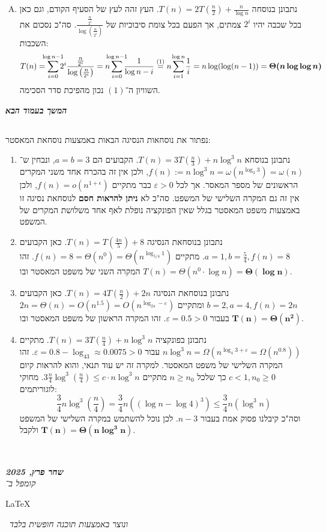 \documentclass[]{article}
\newcommand\en[1] {\begin{otherlanguage}{english}#1\end{otherlanguage}}
\newcommand\sen   {\begin{otherlanguage}{english}}
\newcommand\she   {\end{otherlanguage}}
\newcommand\npage {\she\vfil {\hfil \textbf{\textit{המשך בעמוד הבא}}} \hfil \vfil \pagebreak\sen}
\newcommand\ndoc  {\dotfill \\ \vfil {\begin{center}
			{\textbf{\textit{שחר פרץ, 2025}} \\
				\scriptsize \textit{קומפל ב־}\en{\LaTeX}\,\textit{ ונוצר באמצעות תוכנה חופשית בלבד}}
	\end{center}} \vfil	}
\newcommand\epsi  {\epsilon}
\newcommand\vepsi {\varepsilon}
\newcommand\logn  {\log n}
\newcommand\cl [1]    {\left ( #1 \right )}
\theoremstyle{definition}
\begin{document}
\begin{enumerate}[A.]
		\item נתבונן בנוסחה $T(n) = 2T\cl{\frac{n}{2}} + \frac{n}{\log n}$. העץ זהה לעץ של הסעיף הקודם, וגם כאן בכל שכבה יהיו $2^i$ צמתים, אך הפעם בכל צומת סיבוכיות של $\frac{\frac{n}{2^i}}{\log\cl{\frac{n}{2^i}}}$. סה"כ נסכום את השכבות: 
		\[ T(n) = \sum_{i = 0}^{\mathclap{\logn - 1}}2^i \frac{\frac{n}{2^i}}{\log\cl{\frac{n}{2^i}}} = n \sum_{i = 0}^{\mathclap{\logn - 1}} \frac{1}{\logn - i} \overset{(1)}{=} n \sum_{i = 1}^{\mathclap{\logn}}\frac{1}{i} = n \log(\log (n - 1)) = \bm{\Theta(n \log\logn)} \]
		השוויון ה־$(1)$ נכון מהפיכת סדר הסכימה. 
		
	\end{enumerate}\sen	
	\npage
	
	\section{}
	\she
	נפתור את נוסחאות הנסיגה הבאות באמצעות נוסחאת המאסטר: 
	\begin{enumerate}
		\item נתבונן בנוסחא $T(n) = 3T\cl{\frac{n}{3}} + n\log^3 n$. הקבועים הם $a = b = 3$, ונבחין ש־$f(n) := n\log^3 n = \omega (n^{\log_{3}3}) = \omega(n)$, ולכן אין זה בהכרח אחד משני המקרים הראשונים של מספר המאסר. אך לכל $\vepsi > 0$ כבר מתקיים $f(n) = o(n^{1 + \epsi})$, ולכן אין זה גם המקרה השלישי של המשפט. סה"כ לא \textbf{ניתן להראות חסם} לנוסחאת נסיגה זו באמצעות משפט המאסטר בגלל שאין הפונקציה נופלת לאף אחד משלושת המקרים של המשפט. 
		\item נתבונן בנוסחאת הנסיגה $T(n) = T\cl{\frac{4n}{5}} + 8$. כאן הקבועים $a = 1, b = \frac{5}{4}, f(n) =8$. מתקיים $f(n) = 8 = \Theta(n^0) = \Theta(n^{\log_{5/4}1})$. זהו המקרה השני של משפט המאסטר ובו $T(n) = \Theta(n^0 \cdot \logn) = \bm{\Theta (\logn)}$. 
		\item נתבונן בנוסחאת הנסיגה $T(n) = 4T\cl{\frac{n}{2}} + 2n$. כאן הקבועים $b = 2, a = 4, f(n) = 2n$ ומתקיים $2n = \Theta(n) = O(n^{1.5}) = O\cl{n^{\log_24 - \vepsi}}$ בעבור $\vepsi = 0.5 > 0$. זהו המקרה הראשון של משפט המאסטר ובו $\bm{T(n) = \Theta(n^{2})}$. 
		\item נתבונן בפונקציה $T(n) = 3T\cl{\frac{n}{4}} + n\log^3 n$. מתקיים $n \log ^3n = \Omega\cl{n^{\log_4 3 + \vepsi} = \Omega\cl{n^{0.8}}}$ עבור $\vepsi = 0.8 - \log_43 \approx 0.0075 > 0$. זהו המקרה השלישי של משפט המאסטר. למקרה זה יש עוד תנאי, והוא להראות קיום $c < 1, n_0 \ge 0$ כך שלכל $n \ge n_0$ מתקיים $3\frac{n}{4}\log^3\cl{\frac{n}{4}} \le c \cdot n \log^3 n$. מחוקי לוגוריתמים: 
		\[ \frac{3}{4}n\log^3\cl{\frac{n}{4}} = \frac{3}{4}n \cl{(\log n - \log 4)^3} \le  \frac{3}{4}n \cl{\log^3 n} \]
		וסה"כ קיבלנו פסוק אמת בעבור $n - 3$. לכן נוכל להשתמש במקרה השלישי של המשפט ולקבל $\bm{T(n) = \Theta\cl{n\log^3 n}}$. 
	\end{enumerate}
	
	
	\ndoc
\end{document}
